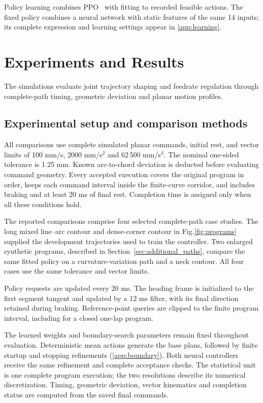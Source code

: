 \documentclass[preprint,12pt]{elsarticle}
\begin{document}
Policy learning combines PPO~\citep{Schulman2017PPO} with fitting to recorded feasible actions. The fixed policy combines a neural network with static features of the same 14 inputs; its complete expression and learning settings appear in \ref{app:learning}.

\section{Experiments and Results}
\label{sec:experiments}
The simulations evaluate joint trajectory shaping and feedrate regulation through complete-path timing, geometric deviation and planar motion profiles.

\subsection{Experimental setup and comparison methods}
All comparisons use complete simulated planar commands, initial rest, and vector limits of 100 mm/s, 2000 mm/s$^2$ and 62\,500 mm/s$^3$. The nominal one-sided tolerance is 1.25 mm. Known arc-to-chord deviation is deducted before evaluating command geometry. Every accepted execution covers the original program in order, keeps each command interval inside the finite-curve corridor, and includes braking and at least 20 ms of final rest. Completion time is assigned only when all these conditions hold.

The reported comparisons comprise four selected complete-path case studies. The long mixed line--arc contour and dense-corner contour in Fig.\nobreakspace\ref{fig:programs} supplied the development trajectories used to train the controller. Two enlarged synthetic programs, described in Section~\ref{sec:additional_paths}, compare the same fitted policy on a curvature-variation path and a neck contour. All four cases use the same tolerance and vector limits.

Policy requests are updated every 20 ms. The heading frame is initialized to the first segment tangent and updated by a 12 ms filter, with its final direction retained during braking. Reference-point queries are clipped to the finite program interval, including for a closed one-lap program.

The learned weights and boundary-search parameters remain fixed throughout evaluation. Deterministic mean actions generate the base plans, followed by finite startup and stopping refinements (\ref{app:boundary}). Both neural controllers receive the same refinement and complete acceptance checks. The statistical unit is one complete program execution; the two resolutions describe its numerical discretization. Timing, geometric deviation, vector kinematics and completion status are computed from the saved final commands.
\end{document}
